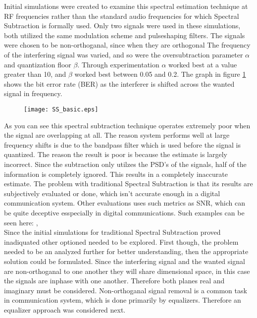 Initial simulations were created to examine this spectral estimation technique at RF frequencies rather than the standard audio frequencies for which Spectral Subtraction is formally used.  Only two signals were used in these simulations, both utilized the same modulation scheme and pulseshaping filters.  The signals were chosen to be non-orthoganal, since when they are orthogonal The frequency of the interfering signal was varied, and so were the oversubtraction parameter \(\alpha\) and quantization floor \(\beta\).  Through experimentation \(\alpha\) worked best at a value greater than 10, and \(\beta\) worked best between 0.05 and 0.2.  The graph in figure \ref{SS_basic} shows the bit error rate (BER) as the interferer is shifted across the wanted signal in frequency.\\

\begin{figure}\label{SS_basic}
\texttt{[image: SS\_basic.eps]}
\end{figure} 

As you can see this spectral subtraction technique operates extremely poor when the signal are overlapping at all.  The reason system performs well at large frequency shifts is due to the bandpass filter which is used before the signal is quantized.  The reason the result is poor is because the estimate is largely incorrect.  Since the subtraction only utilzes the PSD's of the signals, half of the information is completely ignored.  This results in a completely inaccurate estimate.  The problem with traditional Spectral Subtraction is that its results are subjectively evaluated or done, which isn't accurate enough in a digital communication system.  Other evaluations uses such metrics as SNR, which can be quite deceptive esspecially in digital communications.  Such examples can be seen here: \cite{ss_subjective1}, \cite{ss_subjective2} \\

Since the initial simulations for traditional Spectral Subtraction proved inadiquated other optioned needed to be explored.  First though, the problem needed to be an analyzed further for better understanding, then the appropriate solution could be formulated.  Since the interfering signal and the wanted signal are non-orthoganal to one another they will share dimensional space, in this case the signals are inphase with one another.  Therefore both planes real and imaginary must be considered.  Non-orthoganal signal removal is a common task in communication system, which is done primarily by equalizers.  Therefore an equalizer approach was considered next.\\

